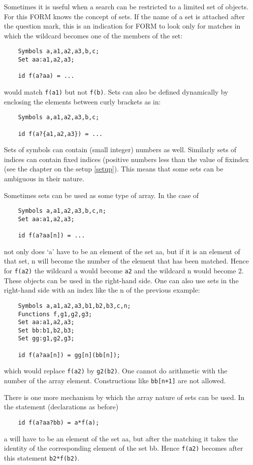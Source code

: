Sometimes it is useful when a search can be restricted to a limited set of 
objects. For this FORM knows the concept of sets. If the name of 
a set is attached after the question mark, this is an indication for FORM 
to look only for matches in which the wildcard becomes one of the members 
of the set:
\begin{verbatim}
    Symbols a,a1,a2,a3,b,c;
    Set aa:a1,a2,a3;

    id f(a?aa) = ...
\end{verbatim}
would match \verb:f(a1): but not \verb:f(b):. Sets can also be defined 
dynamically by enclosing the elements between curly 
brackets as in:
\begin{verbatim}
    Symbols a,a1,a2,a3,b,c;

    id f(a?{a1,a2,a3}) = ...
\end{verbatim}
Sets of symbols can contain (small integer) numbers 
as well. Similarly sets of indices can contain fixed 
indices (positive numbers less than the value of fixindex 
(see the chapter on the setup \ref{setup}). This means that some sets can 
be ambiguous in their nature.

Sometimes sets can be used as some type of 
array. In the case of
\begin{verbatim}
    Symbols a,a1,a2,a3,b,c,n;
    Set aa:a1,a2,a3;

    id f(a?aa[n]) = ...
\end{verbatim}
not only does `a' have to be an element of the set aa, but if it is an 
element of that set, n will become the number of the element that has been 
matched. Hence for \verb:f(a2): the wildcard a would become \verb:a2: and 
the wildcard n would become 2. These objects can be used in the 
right-hand side. One can also use sets in the right-hand side with an index 
like the n of the previous example:
\begin{verbatim}
    Symbols a,a1,a2,a3,b1,b2,b3,c,n;
    Functions f,g1,g2,g3;
    Set aa:a1,a2,a3;
    Set bb:b1,b2,b3;
    Set gg:g1,g2,g3;

    id f(a?aa[n]) = gg[n](bb[n]);
\end{verbatim}
which would replace \verb:f(a2): by \verb:g2(b2):. One cannot do 
arithmetic with the number of the array element. 
Constructions like \verb:bb[n+1]: are not allowed.

There is one more mechanism by which the array nature of sets can be used. 
In the statement (declarations as before)
\begin{verbatim}
    id f(a?aa?bb) = a*f(a);
\end{verbatim}
a will have to be an element of the set aa, but after the matching it takes 
the identity of the corresponding element of 
the set bb. Hence \verb:f(a2): becomes after this statement 
\verb:b2*f(b2):.

